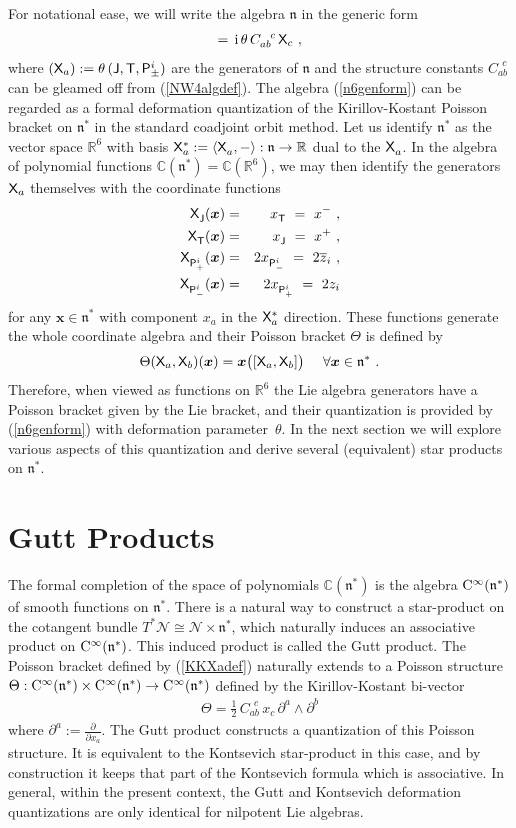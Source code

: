 \documentclass[11pt,a4paper]{article}
\def\nn{\nonumber}
\newcommand{\1}{\mathbb{1}}
\newcommand{\mbf}[1]{{\boldsymbol {#1} }}
\def\ii{{\,{\rm i}\,}}
\def\CC{{\rm C}}
\def\P{{\sf P}}
\def\T{{\sf T}}
\def\X{{\sf X}}
\def\J{{\sf J}}
\def\mx{{\mbf x}}
\def\mfn{{\mathfrak n}}
\newcommand{\newsection}{\setcounter{equation}{0}\section}
\newcommand{\complex}{{\mathbb C}} %
\newcommand{\real}{{\mathbb R}} %
\def\nn{\nonumber}
\def\bea{\begin{eqnarray}}
\def\eea{\end{eqnarray}}
\newcommand{\beq}{\begin{eqnarray}}
\newcommand{\eeq}{\end{eqnarray}}
\begin{document}
For notational ease, we will write the algebra $\mathfrak{n}$ in the
generic form
\beq
[\X_a,\X_b]=\ii\theta\,C_{ab}^{~~c}\,\X_c \ ,
\label{n6genform}\eeq
where $(\X_a):=\theta\,(\J,\T,\P^i_\pm)$ are the
generators of $\mathfrak{n}$ and the structure constants
$C_{ab}^{~~c}$ can be gleamed off from (\ref{NW4algdef}). The algebra
(\ref{n6genform}) can be regarded
as a formal deformation quantization of the Kirillov-Kostant Poisson bracket on
$\mathfrak{n}^*$ in the standard coadjoint orbit method. Let us
identify $\mathfrak{n}^*$ as the vector space $\real^6$ with basis
$\X_a^*:=\langle\X^{~}_a,-\rangle:\mfn\to\real$ dual to the
$\X_a^{~}$. In the algebra of polynomial functions
$\complex(\mathfrak{n}^*)=\complex(\real^6)$, we may then identify
the generators $\X_a$ themselves with the coordinate functions
\bea
\X^{~}_\J(\mx)&=&x^{~}_\T~=~x^- \ , \nn\\ \X^{~}_\T(\mx)
&=&x^{~}_\J~=~x^+ \ , \nn\\ 
\X^{~}_{\P_+^i}(\mx)&=&2x^{~}_{\P_-^i}~=~2\overline{z}_i \ ,
\nn\\ \X^{~}_{\P_-^i}(\mx)&=&2x^{~}_{\P_+^i}~=~2z_i
\label{Xacoordfns}\eea
for any $\mx\in\mathfrak{n}^*$ with component $x_a$ in the $\X_a^*$
direction. These functions generate the whole coordinate algebra and
their Poisson bracket $\Theta$ is defined by
\beq
\Theta(\X_a,\X_b)(\mx)=\mx\bigl([\X_a,\X_b]\bigr) ~~~~ \forall\mx\in
\mathfrak{n}^* \ .
\label{KKXadef}\eeq
Therefore, when viewed as functions on $\real^6$ the Lie algebra
generators have a Poisson bracket given by the Lie bracket, and their
quantization is provided by (\ref{n6genform}) with deformation
parameter~$\theta$. In the next section
we will explore various aspects of this quantization and derive
several (equivalent) star products on $\mfn^*$.

\newsection{Gutt Products\label{StarProds}}

The formal completion of the space of polynomials $\complex(\mfn^*)$ is the
algebra ${\rm C}^\infty(\mathfrak{n}^*)$ of smooth functions on
$\mathfrak{n}^*$. There is a natural way to construct a star-product
  on the cotangent bundle
  $T^*\mathcal{N}\cong\mathcal{N}\times\mathfrak{n}^*$, which
  naturally induces
  an associative product on ${\rm C}^\infty(\mfn^*)$. This induced
  product is called the Gutt product. The Poisson bracket defined by
  (\ref{KKXadef}) naturally extends to a Poisson structure
  $\Theta:\CC^\infty(\mfn^*)\times\CC^\infty(\mfn^*)\to\CC^\infty(\mfn^*)$
  defined by the Kirillov-Kostant bi-vector
\beq
\Theta=\mbox{$\frac12$}\,C_{ab}^{~~c}\,x_c\,\partial^a\wedge\partial^b
\label{KKbivector}\eeq
where $\partial^a:=\frac{\partial}{\partial x_a}$. The Gutt product constructs a
  quantization of this Poisson structure. It is equivalent to the
  Kontsevich star-product in this case, and by construction it keeps
  that part of the Kontsevich formula which is associative. In
  general, within the present context, the Gutt and Kontsevich
  deformation quantizations are only identical for nilpotent Lie
  algebras.
\end{document}
